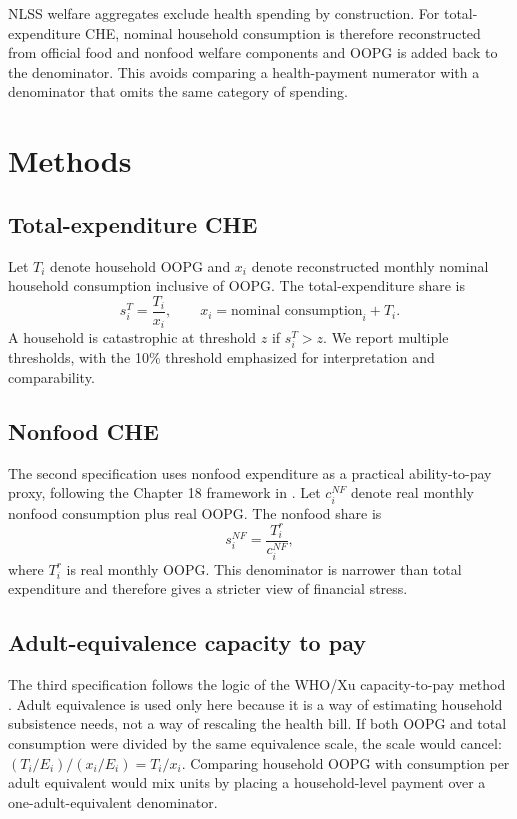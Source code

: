 \documentclass[11pt]{article}
\begin{document}
NLSS welfare aggregates exclude health spending by construction. For total-expenditure CHE, nominal household consumption is therefore reconstructed from official food and nonfood welfare components and OOPG is added back to the denominator. This avoids comparing a health-payment numerator with a denominator that omits the same category of spending.

\section{Methods}

\subsection{Total-expenditure CHE}

Let $T_i$ denote household OOPG and $x_i$ denote reconstructed monthly nominal household consumption inclusive of OOPG. The total-expenditure share is
\begin{equation}
s_i^T = \frac{T_i}{x_i}, \qquad x_i = \text{nominal consumption}_i + T_i.
\end{equation}
A household is catastrophic at threshold $z$ if $s_i^T > z$. We report multiple thresholds, with the 10\% threshold emphasized for interpretation and comparability.

\subsection{Nonfood CHE}

The second specification uses nonfood expenditure as a practical ability-to-pay proxy, following the Chapter 18 framework in \citet{odonnell2008}. Let $c_i^{NF}$ denote real monthly nonfood consumption plus real OOPG. The nonfood share is
\begin{equation}
s_i^{NF} = \frac{T_i^r}{c_i^{NF}},
\end{equation}
where $T_i^r$ is real monthly OOPG. This denominator is narrower than total expenditure and therefore gives a stricter view of financial stress.

\subsection{Adult-equivalence capacity to pay}

The third specification follows the logic of the WHO/Xu capacity-to-pay method \citep{xu2003,xu2005}. Adult equivalence is used only here because it is a way of estimating household subsistence needs, not a way of rescaling the health bill. If both OOPG and total consumption were divided by the same equivalence scale, the scale would cancel: $(T_i/E_i)/(x_i/E_i)=T_i/x_i$. Comparing household OOPG with consumption per adult equivalent would mix units by placing a household-level payment over a one-adult-equivalent denominator.
\end{document}
